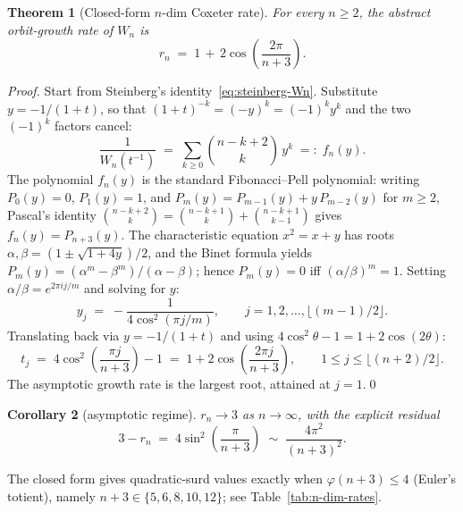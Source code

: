 \documentclass[11pt,a4paper]{article}
\newtheorem{theorem}{Theorem}
\newtheorem{corollary}[theorem]{Corollary}
\theoremstyle{remark}
\theoremstyle{plain}
\begin{document}
\begin{theorem}[Closed-form $n$-dim Coxeter rate]
\label{thm:ndim-rate}
For every $n \ge 2$, the abstract orbit-growth rate of $W_n$ is
\[
r_n  \;=\;  1 \,+\, 2 \cos\!\left(\frac{2\pi}{n+3}\right).
\]
\end{theorem}

\begin{proof}
Start from Steinberg's identity~\eqref{eq:steinberg-Wn}.  Substitute
$y = -1/(1+t)$, so that $(1+t)^{-k} = (-y)^k = (-1)^k y^k$ and the
two $(-1)^k$ factors cancel:
\[
\frac{1}{W_n(t^{-1})}  \;=\;  \sum_{k \ge 0} \binom{n-k+2}{k}\, y^k
                      \;=:\;  f_n(y).
\]
The polynomial $f_n(y)$ is the standard Fibonacci--Pell polynomial:
writing $P_0(y) = 0$, $P_1(y) = 1$, and
$P_m(y) = P_{m-1}(y) + y\, P_{m-2}(y)$ for $m \ge 2$, Pascal's
identity $\binom{n-k+2}{k} = \binom{n-k+1}{k} + \binom{n-k+1}{k-1}$
gives $f_n(y) = P_{n+3}(y)$.  The characteristic equation
$x^2 = x + y$ has roots $\alpha, \beta = (1 \pm \sqrt{1+4y})/2$, and
the Binet formula yields $P_m(y) = (\alpha^m - \beta^m)/(\alpha - \beta)$;
hence $P_m(y) = 0$ iff $(\alpha/\beta)^m = 1$.  Setting
$\alpha/\beta = e^{2\pi i j / m}$ and solving for $y$:
\[
y_j  \;=\;  -\frac{1}{4 \cos^2(\pi j / m)},
\qquad j = 1, 2, \ldots, \lfloor (m-1)/2 \rfloor.
\]
Translating back via $y = -1/(1+t)$ and using
$4 \cos^2\theta - 1 = 1 + 2 \cos(2\theta)$:
\[
t_j  \;=\;  4 \cos^2\!\left(\frac{\pi j}{n+3}\right) - 1
       \;=\;  1 + 2 \cos\!\left(\frac{2\pi j}{n+3}\right),
\qquad 1 \le j \le \lfloor (n+2)/2 \rfloor.
\]
The asymptotic growth rate is the largest root, attained at $j = 1$.\qed
\end{proof}

\begin{corollary}[asymptotic regime]
$r_n \to 3$ as $n \to \infty$, with the explicit residual
\[
3 - r_n  \;=\;  4 \sin^2\!\left(\frac{\pi}{n+3}\right)
         \;\sim\;  \frac{4 \pi^2}{(n + 3)^2}.
\]
\end{corollary}

The closed form gives quadratic-surd values exactly when
$\varphi(n+3) \le 4$ (Euler's totient), namely $n + 3 \in
\{5, 6, 8, 10, 12\}$; see Table~\ref{tab:n-dim-rates}.
\end{document}
